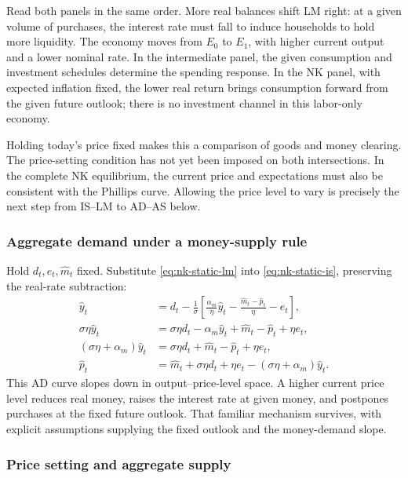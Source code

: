 Read both panels in the same order. More real balances shift LM right: at a
given volume of purchases, the interest rate must fall to induce households
to hold more liquidity. The economy moves from $E_0$ to $E_1$, with higher
current output and a lower nominal rate. In the intermediate panel, the given
consumption and investment schedules determine the spending response. In the
NK panel, with expected inflation fixed, the lower real return brings
consumption forward from the given future outlook; there is no investment
channel in this labor-only economy.

Holding today's price fixed makes this a comparison of goods and money clearing.
The price-setting condition has not yet been imposed on both intersections.
In the complete NK equilibrium, the current price and expectations must also
be consistent with the Phillips curve. Allowing the price level to vary is
precisely the next step from IS--LM to AD--AS below.

\subsubsection{Aggregate demand under a money-supply rule}

Hold $d_t,e_t,\hat m_t$ fixed. Substitute \eqref{eq:nk-static-lm} into
\eqref{eq:nk-static-is}, preserving the real-rate subtraction:
\begin{align}
 \hat y_t
 &=d_t-\frac1\sigma\left[
    \frac{\alpha_m}{\eta}\hat y_t
           -\frac{\hat m_t-\hat p_t}{\eta}-e_t\right],\\
 \sigma\eta\hat y_t
 &=\sigma\eta d_t-\alpha_m\hat y_t+\hat m_t-\hat p_t+\eta e_t,\\
 (\sigma\eta+\alpha_m)\hat y_t
 &=\sigma\eta d_t+\hat m_t-\hat p_t+\eta e_t,\\
 \hat p_t&=\hat m_t+\sigma\eta d_t+\eta e_t
                         -(\sigma\eta+\alpha_m)\hat y_t.
 \label{eq:nk-static-ad}
\end{align}
This AD curve slopes down in output--price-level space. A higher current price
level reduces real money, raises the interest rate at given money, and postpones
purchases at the fixed future outlook. That familiar mechanism survives, with
explicit assumptions supplying the fixed outlook and the money-demand slope.

\subsubsection{Price setting and aggregate supply}

